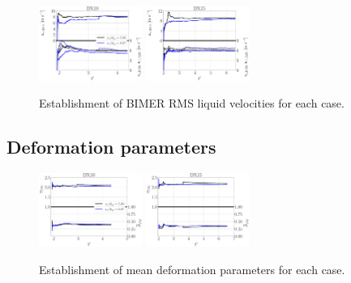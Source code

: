 \vspace*{0.2in}

\begin{figure}[ht]
	\centering
   \includegraphics[width=0.3\textwidth]{./part3_applications/figures_ch8_resolved/SPRAY_characterization/velocities/establishment_DX10_rms}
   \includegraphics[width=0.3\textwidth]{./part3_applications/figures_ch8_resolved/SPRAY_characterization/velocities/establishment_DX15_rms}
   \caption{Establishment of BIMER RMS liquid velocities for each case.}
\label{fig:app_BIMER_spray_velocities_establishment_rms}
\end{figure}

\clearpage


\subsection*{Deformation parameters}

\begin{figure}[ht]
	\centering
   \includegraphics[width=0.3\textwidth]{./part3_applications/figures_ch8_resolved/SPRAY_characterization/deformation/establishment_DX10_mean}
   \includegraphics[width=0.3\textwidth]{./part3_applications/figures_ch8_resolved/SPRAY_characterization/deformation/establishment_DX15_mean}
   \caption{Establishment of mean deformation parameters for each case.}
\label{fig:app_BIMER_spray_deformation_establishment_mean}
\end{figure}


